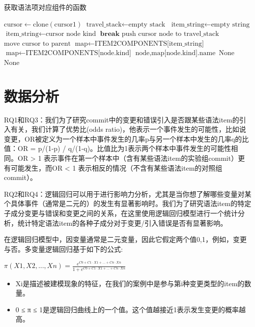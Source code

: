 \begin{algorithm}
\caption{获取语法项对应组件的函数}
\label{algorithm2}
\begin{algorithmic}[1]
    \State $\text{cursor} \gets \text{clone}(\text{cursor1})$
    \State $\text{travel\_stack} \gets \text{empty stack}$
    \State $\text{item\_string} \gets \text{empty string}$
            \State $\text{item\_string} \gets \text{cursor node kind}$
            \State $\textbf{break}$
        \EndIf
        \State $\text{push cursor node to travel\_stack}$
        \State $\text{move cursor to parent}$
    \EndWhile
    \State $\text{map} \gets \text{ITEM2COMPONENTS[item\_string]}$
                \State $\text{map} \gets \text{ITEM2COMPONENTS[node.kind]}$
            \Else
                \State \Return $\text{node}, \text{map[node.kind].name}$
            \EndIf
        \Else
            \State \Return $\text{None}$
        \EndIf
    \EndFor
    \State \Return $\text{None}$
\EndFunction
\end{algorithmic}
\end{algorithm}

\section{数据分析}
RQ1和RQ3：我们为了研究commit中的变更和错误引入是否跟某些语法item的引入有关，我们计算了优势比(odds ratio\cite{bland2000odds})，他表示一个事件发生的可能性，比如说变更，OR被定义为一个样本中事件发生的几率p与另一个样本中发生的几率q的比值：OR = p/(1-p) / q/(1-q)。比值比为1表示两个样本中事件发生的可能性相同。OR > 1 表示事件在第一个样本中（含有某些语法item的实验组commit）更有可能发生，而OR < 1 表示相反的情况（不含有某些语法item的对照组commit）。

RQ2和RQ4：逻辑回归可以用于进行影响力分析，尤其是当你想了解哪些变量对某个具体事件（通常是二元的）的发生有显著影响时。我们为了研究语法item的特定子成分变更与错误和变更之间的关系，在这里使用逻辑回归模型进行一个统计分析，统计特定语法item的各种子成分对于变更/引入错误是否有显著影响。\cite{stoltzfus2011logistic}

在逻辑回归模型中，因变量通常是二元变量，因此它假定两个值{0,1}，例如，变更与否。多变量逻辑回归基于如下的公式:

$π(X1, X2, ..., Xn) = \frac{e^{C0+C1·X1+...+Cn·Xn}} { 1 + e^{C0+C1·X1+...+Cn·Xn}}$

\begin{itemize}
    \item Xi是描述被建模现象的特征，在我们的案例中是参与第i种变更类型的item的数量。
    \item 0 ≤ π ≤ 1是逻辑回归曲线上的一个值。这个值越接近1表示发生变更的概率越高。
\end{itemize}